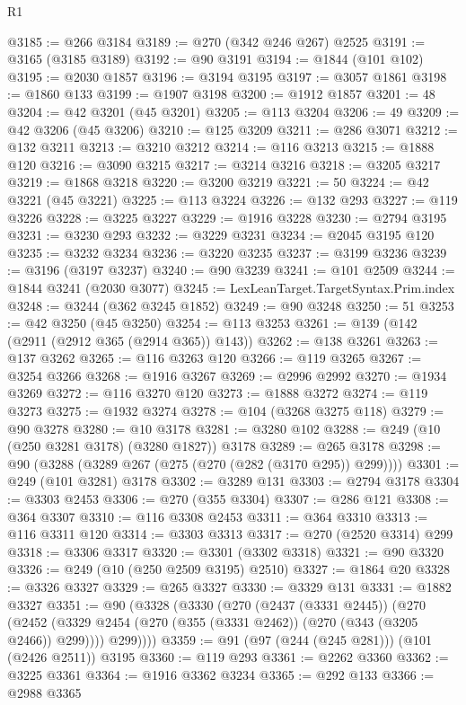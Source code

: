 \begin{lexlean}{R1}
\begin{coremodule}
@3185 := @266 @3184
@3189 := @270 (@342 @246 @267) @2525
@3191 := @3165 (@3185 @3189)
@3192 := @90 @3191
@3194 := @1844 (@101 @102)
@3195 := @2030 @1857
@3196 := @3194 @3195
@3197 := @3057 @1861
@3198 := @1860 @133
@3199 := @1907 @3198
@3200 := @1912 @1857
@3201 := 48
@3204 := @42 @3201 (@45 @3201)
@3205 := @113 @3204
@3206 := 49
@3209 := @42 @3206 (@45 @3206)
@3210 := @125 @3209
@3211 := @286 @3071
@3212 := @132 @3211
@3213 := @3210 @3212
@3214 := @116 @3213
@3215 := @1888 @120
@3216 := @3090 @3215
@3217 := @3214 @3216
@3218 := @3205 @3217
@3219 := @1868 @3218
@3220 := @3200 @3219
@3221 := 50
@3224 := @42 @3221 (@45 @3221)
@3225 := @113 @3224
@3226 := @132 @293
@3227 := @119 @3226
@3228 := @3225 @3227
@3229 := @1916 @3228
@3230 := @2794 @3195
@3231 := @3230 @293
@3232 := @3229 @3231
@3234 := @2045 @3195 @120
@3235 := @3232 @3234
@3236 := @3220 @3235
@3237 := @3199 @3236
@3239 := @3196 (@3197 @3237)
@3240 := @90 @3239
@3241 := @101 @2509
@3244 := @1844 @3241 (@2030 @3077)
@3245 := LexLeanTarget.TargetSyntax.Prim.index
@3248 := @3244 (@362 @3245 @1852)
@3249 := @90 @3248
@3250 := 51
@3253 := @42 @3250 (@45 @3250)
@3254 := @113 @3253
@3261 := @139 (@142 (@2911 (@2912 @365 (@2914 @365)) @143))
@3262 := @138 @3261
@3263 := @137 @3262
@3265 := @116 @3263 @120
@3266 := @119 @3265
@3267 := @3254 @3266
@3268 := @1916 @3267
@3269 := @2996 @2992
@3270 := @1934 @3269
@3272 := @116 @3270 @120
@3273 := @1888 @3272
@3274 := @119 @3273
@3275 := @1932 @3274
@3278 := @104 (@3268 @3275 @118)
@3279 := @90 @3278
@3280 := @10 @3178
@3281 := @3280 @102
@3288 := @249 (@10 (@250 @3281 @3178) (@3280 @1827)) @3178
@3289 := @265 @3178
@3298 := @90 (@3288 (@3289 @267 (@275 (@270 (@282 (@3170 @295)) @299))))
@3301 := @249 (@101 @3281) @3178
@3302 := @3289 @131
@3303 := @2794 @3178
@3304 := @3303 @2453
@3306 := @270 (@355 @3304)
@3307 := @286 @121
@3308 := @364 @3307
@3310 := @116 @3308 @2453
@3311 := @364 @3310
@3313 := @116 @3311 @120
@3314 := @3303 @3313
@3317 := @270 (@2520 @3314) @299
@3318 := @3306 @3317
@3320 := @3301 (@3302 @3318)
@3321 := @90 @3320
@3326 := @249 (@10 (@250 @2509 @3195) @2510)
@3327 := @1864 @20
@3328 := @3326 @3327
@3329 := @265 @3327
@3330 := @3329 @131
@3331 := @1882 @3327
@3351 := @90
    (@3328
      (@3330
        (@270
          (@2437 (@3331 @2445))
          (@270
            (@2452 (@3329 @2454 (@270 (@355 (@3331 @2462)) (@270 (@343 (@3205 @2466)) @299))))
            @299))))
@3359 := @91 (@97 (@244 (@245 @281))) (@101 (@2426 @2511)) @3195
@3360 := @119 @293
@3361 := @2262 @3360
@3362 := @3225 @3361
@3364 := @1916 @3362 @3234
@3365 := @292 @133
@3366 := @2988 @3365

\end{coremodule}
\end{lexlean}
